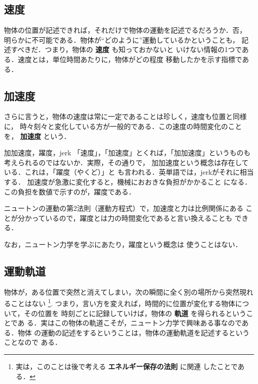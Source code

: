         \subsection{速度}
        物体の位置が記述できれば，それだけで物体の運動を記述でるだろうか．否，
        明らかに不可能である．物体が“どのように”運動しているかということも，
        記述すべきだ．つまり，物体の \textbf{速度} も知っておかないと
        いけない情報の1つである．速度とは，単位時間あたりに，物体がどの程度
        移動したかを示す指標である．

        \subsection{加速度}
        さらに言うと，物体の速度は常に一定であることは珍しく，速度も位置と同様に，
        時々刻々と変化している方が一般的である．この速度の時間変化のことを，
        \textbf{加速度} という．

            \begin{memo}{加加速度，躍度，jerk}
                「速度」，「加速度」とくれば，「加加速度」というものも
                考えられるのではないか．実際，その通りで，
                加加速度という概念は存在している．これは，「躍度（やくど）」と
                も言われる．英単語では，jerkがそれに相当する．
                加速度が急激に変化すると，機械におおきな負担がかかること
                になる．この負担を数値で示すのが，躍度である．

                ニュートンの運動の第2法則（運動方程式）で，加速度と力は比例関係にある
                ことが分かっているので，躍度とは力の時間変化であると言い換えることも
                できる．

                なお，ニュートン力学を学ぶにあたり，躍度という概念は
                使うことはない．
            \end{memo}


        \subsection{運動軌道}
        物体が，ある位置で突然と消えてしまい，次の瞬間に全く別の場所から突然現れ
        ることはない
            \footnote{
                実は，このことは後で考える \textbf{エネルギー保存の法則} に関連
                したことである．
            }.
        つまり，言い方を変えれば，時間的に位置が変化する物体について，その位置を
        時刻ごとに記録していけば，物体の \textbf{軌道} を得られるということであ
        る．実はこの物体の軌道こそが，ニュートン力学で興味ある事なのである．物体
        の運動の記述をするということは，物体の運動軌道を記述するということなので
        ある．

